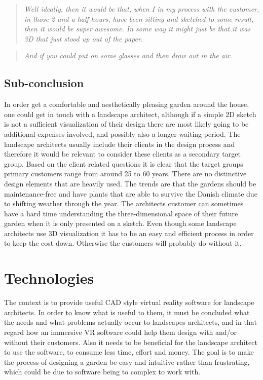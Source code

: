 		\begin{quote}
			\textit{Well ideally, then it would be that, when I in my process with the customer, in those 2 and a half hours, have been sitting and sketched to some result, then it would be super awesome. In some way it might just be that it was 3D that just stood up out of the paper}\label{quote:expertIdeas3}.\\
		\end{quote}
		
		\begin{quote}
			\textit{And if you could put on some glasses and then draw out in the air}\label{quote:expertIdeas4}.\\
		\end{quote}
		
	\subsection{Sub-conclusion}
		In order get a comfortable and aesthetically pleasing garden around the house, one could get in touch with a landscape architect, although if a simple 2D sketch is not a sufficient visualization of their design there are most likely going to be additional expenses involved, and possibly also a longer waiting period.
		The landscape architects usually include their clients in the design process and therefore it would be relevant to consider these clients as a secondary target group. Based on the client related questions it is clear that the target groups primary customers range from around 25 to 60 years. There are no distinctive design elements that are heavily used. The trends are that the gardens should be maintenance-free and have plants that are able to survive the Danish climate due to shifting weather through the year. The architects customer can sometimes have a hard time understanding the three-dimensional space of their future garden when it is only presented on a sketch. Even though some landscape architects use 3D visualization it has to be an easy and efficient process in order to keep the cost down. Otherwise the customers will probably do without it.
		
	\section{Technologies}\label{sec:technologies}
		The context is to provide useful CAD style virtual reality software for landscape architects. In order to know what is useful to them, it must be concluded what the needs and what problems actually occur to landscapes architects, and in that regard how an immersive VR software could help them design with and/or without their customers. Also it needs to be beneficial for the landscape architect to use the software, to consume less time, effort and money. The goal is to make the process of designing a garden be easy and intuitive rather than frustrating, which could be due to software being to complex to work with.
	
